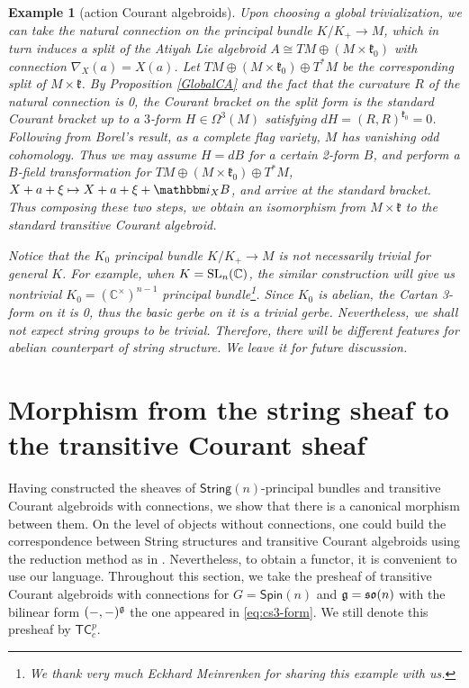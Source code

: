 \documentclass[letterpaper,10pt, oneside]{article} %
\newtheorem{ep}[thm]{Example}
\newcommand{\tcalgdp}{{\mathsf{TC}^{p}_{c}}} %
\newcommand{\String}{\mathsf{String}}%
\newcommand{\Spin}{\mathsf{Spin}}%
\newcommand{\ii}{\mathbbm i}
\newcommand{\frkk}{\mathfrak k}
\begin{document}
\begin{ep}[action Courant algebroids]
{Upon choosing a global trivialization, we can take the natural
connection on the principal bundle $K/K_+\to M$, which in turn induces
a split of the Atiyah Lie algebroid $A\cong TM\oplus (M\times\frkk_0)$
with connection $\nabla_X(a)=X(a)$. Let $TM\oplus  (M\times\frkk_0)
\oplus T^*M$ be the corresponding split of $M\times\frkk $. By
Proposition \ref{GlobalCA} and the fact that the curvature $R$ of the
natural connection is 0,  the Courant bracket on the split form is the
standard Courant bracket up to a $3$-form $H\in \Omega^3(M)$
satisfying $dH=(R, R)^{\frkk_0}=0$. Following from Borel's result, as
a complete flag variety, $M$ has vanishing odd cohomology. Thus we may
assume $H=dB$ for a certain 2-form $B$, and perform a $B$-field
transformation for $TM\oplus  (M\times\frkk_0) \oplus T^*M$,
$X+a+\xi\mapsto X +a+\xi+ \ii_X B$, and arrive at the standard
bracket. Thus composing these two steps, we obtain an isomorphism from
$ M\times\frkk$ to the standard transitive Courant algebroid.

Notice that the $K_0$ principal bundle $K/K_+\to M$ is not necessarily
trivial for  general $K$. For example, when $K={\rm
  SL}_n(\mathbb{C})$, the similar construction will give us nontrivial
$K_0=(\mathbb{C^\times})^{n-1}$ principal bundle\footnote{We thank
very much  Eckhard Meinrenken for sharing this example with
us.}. Since $K_0$ is abelian, the Cartan 3-form on it is
0, thus the basic gerbe on it is a trivial gerbe. Nevertheless, we
shall not expect string groups to be trivial. Therefore, there
will be different features for
abelian counterpart of string structure. We leave it for future discussion.
}
\end{ep}

\section{Morphism from the string sheaf to the transitive Courant sheaf}

Having constructed the sheaves of $\String(n)$-principal bundles and
transitive Courant algebroids with connections, we show that there is
a canonical morphism between them. On the level of objects without
connections, one could build the
correspondence between String structures and transitive Courant
algebroids using the reduction method as in
\cite{baraglia-hekmati,BCG}. Nevertheless, to obtain a functor, it is
convenient to use our language. Throughout this section, we take
the presheaf of transitive Courant algebroids with connections for
$G=\Spin(n)$ and $\mathfrak g=\mathfrak{so}(n)$ with the bilinear form $(-,-)^\mathfrak g$ the one appeared in \eqref{eq:cs3-form}. We still denote this presheaf by $\tcalgdp$.
\end{document}
